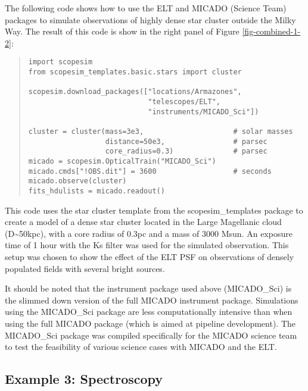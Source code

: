 The following code shows how to use the ELT and MICADO (Science Team) packages to simulate observations of highly dense star cluster outside the Milky Way.
The result of this code is show in the right panel of Figure \ref{fig-combined-1-2}:

\begin{quote}
\begin{alltt}
\begin{minipage}[c]{0.95\textwidth}
\begin{lstlisting}[frame=single]
import scopesim
from scopesim_templates.basic.stars import cluster

scopesim.download_packages(["locations/Armazones",
                            "telescopes/ELT",
                            "instruments/MICADO_Sci"])

cluster = cluster(mass=3e3,                     # solar masses
                  distance=50e3,                # parsec
                  core_radius=0.3)              # parsec
micado = scopesim.OpticalTrain("MICADO_Sci")
micado.cmds["!OBS.dit"] = 3600                  # seconds
micado.observe(cluster)
fits_hdulists = micado.readout()
\end{lstlisting}
\end{minipage}
\end{alltt}
\end{quote}

This code uses the star cluster template from the scopesim\_templates package to create a model of a dense star cluster located in the Large Magellanic cloud (D\textasciitilde{}50kpc), with a core radius of 0.3pc and a mass of 3000 Msun.
An exposure time of 1 hour with the Ks filter was used for the simulated observation.
This setup was chosen to show the effect of the ELT PSF on observations of densely populated fields with several bright sources.

It should be noted that the instrument package used above (MICADO\_Sci) is the slimmed down version of the full MICADO instrument package.
Simulations using the MICADO\_Sci package are less computationally intensive than when using the full MICADO package (which is aimed at pipeline development).
The MICADO\_Sci package was compiled specifically for the MICADO science team to test the feasibility of various science cases with MICADO and the ELT.


\subsection{Example 3: Spectroscopy%
  \label{example-3-spectroscopy}%
}

